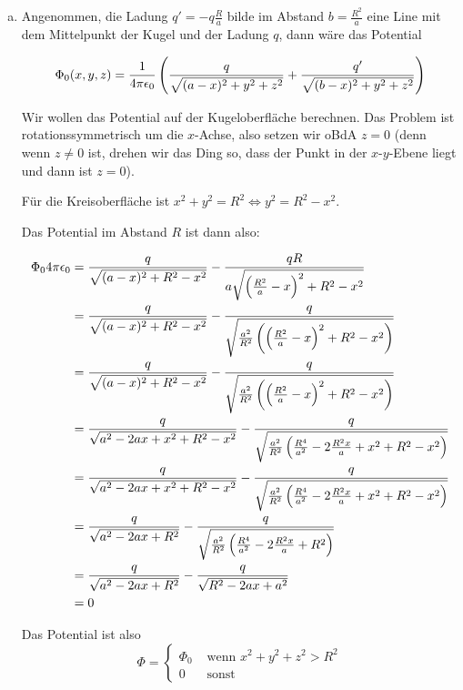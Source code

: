 \documentclass[a4paper,german,12pt,smallheadings]{scrartcl}
\begin{document}
\begin{enumerate}[a)]
  \item
Angenommen, die Ladung $q' = -q \frac{R}{a}$ bilde im Abstand $b =
\frac{R^2}{a}$ eine Line mit dem Mittelpunkt der Kugel und der Ladung $q$, dann
wäre das Potential

\begin{equation}
  \Phi_0(x,y,z) = \frac{1}{4 \pi \epsilon_0} \del{
    \frac{q}{\sqrt{(a-x)^2 + y^2 + z^2}} +
    \frac{q'}{\sqrt{(b-x)^2 + y^2 +z^2}}
  }
\end{equation}

Wir wollen das Potential auf der Kugeloberfläche berechnen. Das Problem ist
rotationssymmetrisch um die $x$-Achse, also setzen wir oBdA $z = 0$ (denn wenn
$z \neq 0$ ist, drehen wir das Ding so, dass der Punkt in der $x$-$y$-Ebene
liegt und dann ist $z=0$).

Für die Kreisoberfläche ist $x^2 + y^2 = R^2 \Leftrightarrow y^2 = R^2 - x^2$.

Das Potential im Abstand $R$ ist dann also:

\begin{align*}
  \Phi_0 4 \pi \epsilon_0 &= \frac{q}{\sqrt{(a-x)^2 + R^2 - x^2}} -
  \frac{qR}{a\sqrt{\del{\frac{R^2}{a} - x}^2 + R^2 - x^2}} \\
   &= \frac{q}{\sqrt{(a-x)^2 + R^2 - x^2}} -
   \frac{q}{\sqrt{\frac{a^2}{R^2} \del{\del{\frac{R^2}{a} - x}^2 + R^2 - x^2}}} \\
   &= \frac{q}{\sqrt{(a-x)^2 + R^2 - x^2}} -
   \frac{q}{\sqrt{\frac{a^2}{R^2} \del{\del{\frac{R^2}{a} - x}^2 + R^2  - x^2}}} \\
   &= \frac{q}{\sqrt{a^2 - 2ax + x^2 + R^2 - x^2}} -
   \frac{q}{\sqrt{\frac{a^2}{R^2} \del{\frac{R^4}{a^2} - 2 \frac{R^2x}{a} + x^2 + R^2 - x^2}}} \\
   &= \frac{q}{\sqrt{a^2 - 2ax + x^2 + R^2 - x^2}} -
   \frac{q}{\sqrt{\frac{a^2}{R^2} \del{\frac{R^4}{a^2} - 2 \frac{R^2x}{a} + x^2 + R^2 - x^2}}} \\
   &= \frac{q}{\sqrt{a^2 - 2ax + R^2}} -
   \frac{q}{\sqrt{\frac{a^2}{R^2} \del{\frac{R^4}{a^2} - 2 \frac{R^2x}{a} + R^2}}} \\
   &= \frac{q}{\sqrt{a^2 - 2ax + R^2}} -
   \frac{q}{\sqrt{R^2 - 2ax + a^2}} \\
   &= 0
\end{align*}

Das Potential ist also
\begin{equation}
  \Phi = \begin{cases}
    \Phi_0 & \text{ wenn } x^2 + y^2 + z^2 > R^2 \\
    0 & \text{ sonst }
  \end{cases}
\end{equation}


\end{enumerate}
\end{document}
